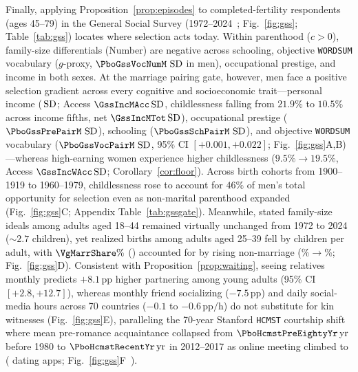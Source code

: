 Finally, applying Proposition~\ref{prop:episodes} to \GssN{} completed-fertility respondents (ages 45--79) in the General Social Survey (1972--2024~\cite{gss2024}; Fig.~\ref{fig:gss}; Table~\ref{tab:gss}) locates where selection acts today. Within parenthood ($c>0$), family-size differentials (Number) are negative across schooling, objective \texttt{WORDSUM} vocabulary ($g$-proxy, $\PboGssVocNumM\,\SD$ in men), occupational prestige, and income in both sexes. At the marriage pairing gate, however, men face a positive selection gradient across every cognitive and socioeconomic trait---personal income (\GssIncMPair\,$\operatorname{SD}$; Access $\GssIncMAcc\SD$, childlessness falling from $21.9\%$ to $10.5\%$ across income fifths, net $\GssIncMTot\SD$), occupational prestige ($\PboGssPrePairM\,\SD$), schooling ($\PboGssSchPairM\,\SD$), and objective \texttt{WORDSUM} vocabulary ($\PboGssVocPairM\,\SD$, 95\% CI $[+0.001,+0.022]$; Fig.~\ref{fig:gss}A,B)---whereas high-earning women experience higher childlessness ($9.5\%\to 19.5\%$, Access $\GssIncWAcc\SD$; Corollary~\ref{cor:floor}). Across birth cohorts from 1900--1919 to 1960--1979, childlessness rose to account for $46\%$ of men's total opportunity for selection even as non-marital parenthood expanded (Fig.~\ref{fig:gss}C; Appendix Table~\ref{tab:gssgate}). Meanwhile, stated family-size ideals among adults aged 18--44 remained virtually unchanged from 1972 to 2024 ($\sim\!2.7$ children), yet realized births among adults aged 25--39 fell by \VgChange{} children per adult, with $\VgMarrShare\%$ (\VgMarr) accounted for by rising non-marriage (\VgNevOld\%$\to$\VgNevNew\%; Fig.~\ref{fig:gss}D). Consistent with Proposition~\ref{prop:waiting}, seeing relatives monthly predicts $+8.1\,\mathrm{pp}$ higher partnering among young adults (95\% CI $[+2.8,+12.7]$), whereas monthly friend socializing ($-7.5\,\mathrm{pp}$) and daily social-media hours across 70 countries ($-0.1$ to $-0.6\,\mathrm{pp/h}$) do not substitute for kin witnesses (Fig.~\ref{fig:gss}E), paralleling the 70-year Stanford \texttt{HCMST} courtship shift where mean pre-romance acquaintance collapsed from $\PboHcmstPreEightyYr\,\mathrm{yr}$ before 1980 to $\PboHcmstRecentYr\,\mathrm{yr}$ in 2012--2017 as online meeting climbed to \PboHcmstRecentOnlinePct{} (\PboHcmstRecentAppPct{} dating apps; Fig.~\ref{fig:gss}F~\cite{rosenfeld2019}).


